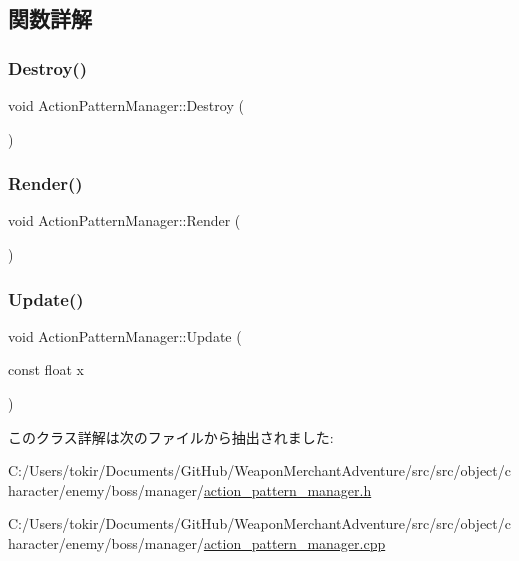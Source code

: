 \subsection{関数詳解}
\mbox{\label{class_action_pattern_manager_a24ae5b706adcb376c222703c55396c03}} 
\subsubsection{\texorpdfstring{Destroy()}{Destroy()}}
{\footnotesize\ttfamily void Action\+Pattern\+Manager\+::\+Destroy (\begin{DoxyParamCaption}{ }\end{DoxyParamCaption})}

\mbox{\label{class_action_pattern_manager_a094e2e5e3bbaf87e597b41b074ba2bd3}} 
\subsubsection{\texorpdfstring{Render()}{Render()}}
{\footnotesize\ttfamily void Action\+Pattern\+Manager\+::\+Render (\begin{DoxyParamCaption}{ }\end{DoxyParamCaption})}

\mbox{\label{class_action_pattern_manager_a0cefb944b14e16b805b549831a8c060b}} 
\subsubsection{\texorpdfstring{Update()}{Update()}}
{\footnotesize\ttfamily void Action\+Pattern\+Manager\+::\+Update (\begin{DoxyParamCaption}\item[{const float}]{x }\end{DoxyParamCaption})}



このクラス詳解は次のファイルから抽出されました\+:\begin{DoxyCompactItemize}
\item 
C\+:/\+Users/tokir/\+Documents/\+Git\+Hub/\+Weapon\+Merchant\+Adventure/src/src/object/character/enemy/boss/manager/\mbox{\hyperlink{action__pattern__manager_8h}{action\+\_\+pattern\+\_\+manager.\+h}}\item 
C\+:/\+Users/tokir/\+Documents/\+Git\+Hub/\+Weapon\+Merchant\+Adventure/src/src/object/character/enemy/boss/manager/\mbox{\hyperlink{action__pattern__manager_8cpp}{action\+\_\+pattern\+\_\+manager.\+cpp}}\end{DoxyCompactItemize}

